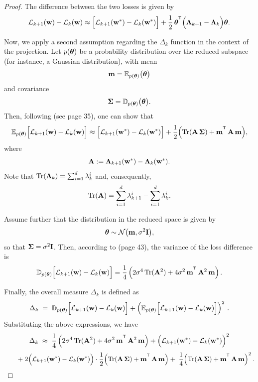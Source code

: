 \documentclass{article}
\begin{document}
\begin{proof}
  The difference between the two losses is given by
  $$\cL_{k+1}(\bw) - \cL_k(\bw) \approx \Bigl[\cL_{k+1}(\bw^*) - \cL_k(\bw^*)\Bigr] + \frac{1}{2}\,\btheta^{\T}
    \Bigl( \bLambda_{k+1} - \bLambda_k \Bigr) \btheta.$$

  Now, we apply a second assumption regarding the $\Delta_k$ function in the context of the projection. Let $p(\boldsymbol{\theta})$ be a probability
  distribution over the reduced subspace (for instance, a Gaussian distribution), with mean
  $$\mathbf{m} = \mathbb{E}_{p(\boldsymbol{\theta})}\bigl(\boldsymbol{\theta}\bigr)$$ and covariance $$\boldsymbol{\Sigma} = \mathbb{D}_{p(\boldsymbol{\theta})}\bigl(\boldsymbol{\theta}\bigr).$$
  Then, following \cite{petersen2012matrix} (see page 35), one can show that
  $$\mathbb{E}_{p(\btheta)} \Bigl[ \cL_{k+1}(\bw) - \cL_k(\bw) \Bigr] \approx \Bigl[ \cL_{k+1}(\bw^*) - \cL_k(\bw^*)\Bigr] +
    \frac{1}{2} \Bigl( \mathrm{Tr}(\bA\,\bSigma) + \bm^{\T}\,\bA\,\bm \Bigr),$$ where $$\mathbf{A} := \boldsymbol{\Lambda}_{k+1}(\mathbf{w}^*) - \boldsymbol{\Lambda}_k(\mathbf{w}^*).$$
  Note that $\mathrm{Tr}(\boldsymbol{\Lambda}_k) = \sum_{i=1}^{d} \lambda_k^i$ and, consequently,
  $$\mathrm{Tr}(\mathbf{A}) = \sum_{i=1}^{d} \lambda_{k+1}^i - \sum_{i=1}^{d} \lambda_k^i.$$

  Assume further that the distribution in the reduced space is given by
  $$\boldsymbol{\theta} \sim \mathcal{N}\bigl(\mathbf{m},\sigma^2 \mathbf{I}\bigr),$$
  so that $\boldsymbol{\Sigma} = \sigma^2 \mathbf{I}$. Then, according to \cite{petersen2012matrix} (page 43), the variance of the loss difference is
  $$\mathbb{D}_{p(\btheta)}\Bigl[ \cL_{k+1}(\bw) - \cL_k(\bw) \Bigr] =\frac{1}{4} \left( 2 \sigma^4\,\mathrm{Tr}(\bA^2) +
    4 \sigma^2\,\bm^{\T}\,\bA^2\,\bm \right).$$

  Finally, the overall measure $\Delta_k$ is defined as
  $$\Delta_{k} \;=\; \mathbb{D}_{p(\boldsymbol{\theta})}\Bigl[ \mathcal{L}_{k+1}(\mathbf{w}) - \mathcal{L}_k(\mathbf{w}) \Bigr] + \left( \mathbb{E}_{p(\boldsymbol{\theta})}
    \Bigl[ \mathcal{L}_{k+1}(\mathbf{w}) - \mathcal{L}_k(\mathbf{w}) \Bigr] \right)^{2}\,.$$
  Substituting the above expressions, we have
  $$\Delta_k \;\approx\; \frac{1}{4}\left( 2 \sigma^4\,\mathrm{Tr}(\bA^2) + 4 \sigma^2\,\bm^{\T}\,\bA^2\,\bm \right) + \Bigl(\cL_{k+1}(\bw^*) -
    \cL_k(\bw^*)\Bigr)^2$$ $$\quad\quad +\; 2\Bigl(\cL_{k+1}(\bw^*) - \cL_k(\bw^*)\Bigr)\cdot \frac{1}{2}\Bigl( \mathrm{Tr}(\bA\,\bSigma) +
    \bm^{\T}\,\bA\,\bm \Bigr) +\; \frac{1}{4}\Bigl( \mathrm{Tr}(\bA\,\bSigma) + \bm^{\T}\,\bA\,\bm \Bigr)^{2}\,.$$


\end{proof}
\end{document}

